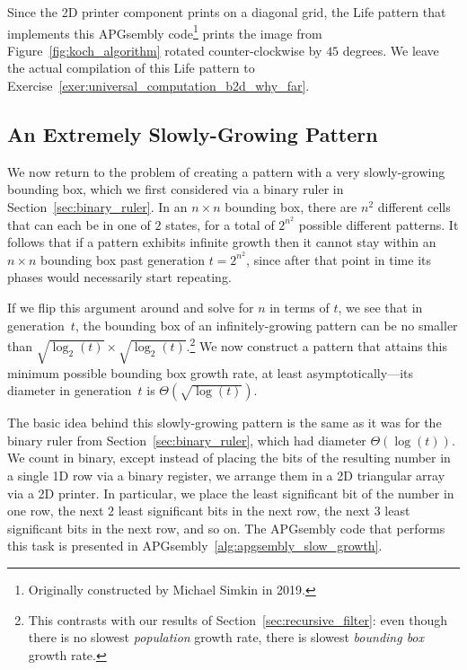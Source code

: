 Since the 2D printer component prints on a diagonal grid, the Life pattern that implements this APGsembly code\footnote{Originally constructed by Michael Simkin in 2019.} prints the image from Figure~\ref{fig:koch_algorithm} rotated counter-clockwise by $45$ degrees. We leave the actual compilation of this Life pattern to Exercise~\ref{exer:universal_computation_b2d_why_far}.


\subsection{An Extremely Slowly-Growing Pattern}\label{sec:Osqrtlogt}

We now return to the problem of creating a pattern with a very slowly-growing bounding box, which we first considered via a binary ruler in Section~\ref{sec:binary_ruler}. In an $n \times n$ bounding box, there are $n^2$ different cells that can each be in one of $2$ states, for a total of $2^{n^2}$ possible different patterns. It follows that if a pattern exhibits infinite growth then it cannot stay within an $n \times n$ bounding box past generation $t = 2^{n^2}$, since after that point in time its phases would necessarily start repeating.

If we flip this argument around and solve for $n$ in terms of $t$, we see that in generation~$t$, the bounding box of an infinitely-growing pattern can be no smaller than $\sqrt{\log_2(t)} \times \sqrt{\log_2(t)}$.\footnote{This contrasts with our results of Section~\ref{sec:recursive_filter}: even though there is no slowest \emph{population} growth rate, there is slowest \emph{bounding box} growth rate.} We now construct a pattern that attains this minimum possible bounding box growth rate, at least asymptotically---its diameter in generation~$t$ is $\Theta(\sqrt{\log(t)})$.

The basic idea behind this slowly-growing pattern is the same as it was for the binary ruler from Section~\ref{sec:binary_ruler}, which had diameter $\Theta(\log(t))$. We count in binary, except instead of placing the bits of the resulting number in a single 1D row via a binary register, we arrange them in a 2D triangular array via a 2D printer. In particular, we place the least significant bit of the number in one row, the next $2$ least significant bits in the next row, the next $3$ least significant bits in the next row, and so on. The APGsembly code that performs this task is presented in APGsembly~\ref{alg:apgsembly_slow_growth}.

